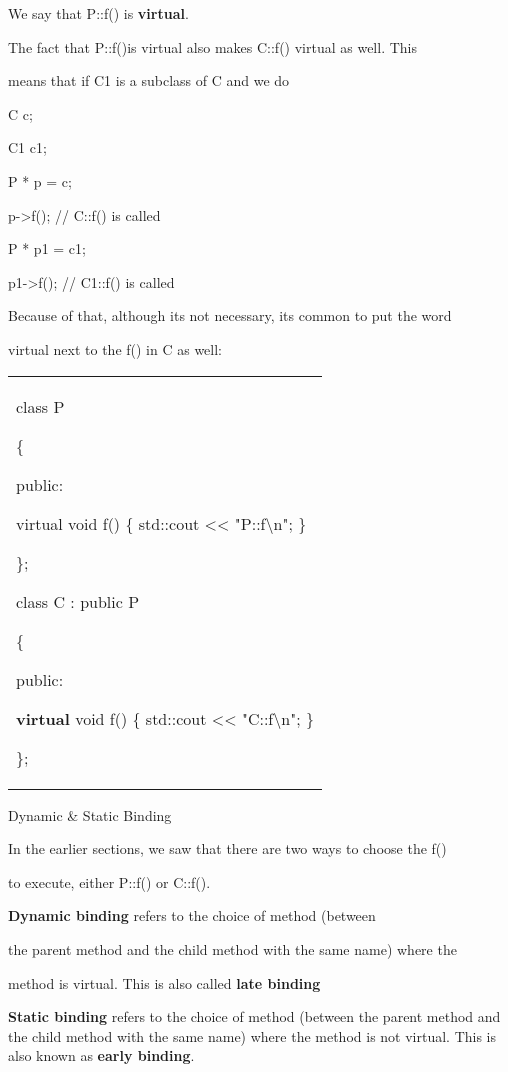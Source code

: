 \documentclass[
]{article}
\begin{document}
We say that P::f() is \textbf{virtual}.

The fact that P::f()is virtual also makes C::f() virtual as well. This

means that if C1 is a subclass of C and we do

C c;

C1 c1;

P * p = c;

p-\textgreater f(); // C::f() is called

P * p1 = c1;

p1-\textgreater f(); // C1::f() is called

Because of that, although it\textquotesingle s not necessary,
it\textquotesingle s common to put the word

virtual next to the f() in C as well:

\begin{longtable}[]{@{}
  >{\raggedright\arraybackslash}p{}@{}}
\toprule\noalign{}
 \\
\midrule\noalign{}
\endhead
\bottomrule\noalign{}
\endlastfoot
class P

\{

public:

virtual void f() \{ std::cout \textless\textless{}
"P::f\textbackslash n"; \}

\};

class C : public P

\{

public:

\textbf{ virtual }void f() \{ std::cout \textless\textless{}
"C::f\textbackslash n"; \}

\}; \\
\end{longtable}

Dynamic \& Static Binding

In the earlier sections, we saw that there are two ways to choose the
f()

to execute, either P::f() or C::f().

\textbf{Dynamic binding }refers to the choice of method (between

the parent method and the child method with the same name) where the

method is virtual. This is also called \textbf{late binding}

\textbf{Static binding }refers to the choice of method (between the
parent method and the child method with the same name) where the method
is not virtual. This is also known as \textbf{early binding}.
\end{document}
